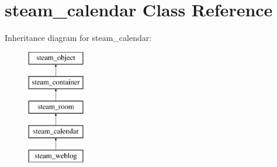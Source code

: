 \hypertarget{classsteam__calendar}{
\section{steam\_\-calendar Class Reference}
\label{classsteam__calendar}
}
Inheritance diagram for steam\_\-calendar:\begin{figure}[H]
\begin{center}
\leavevmode
\includegraphics[height=5.000000cm]{classsteam__calendar}
\end{center}
\end{figure}
